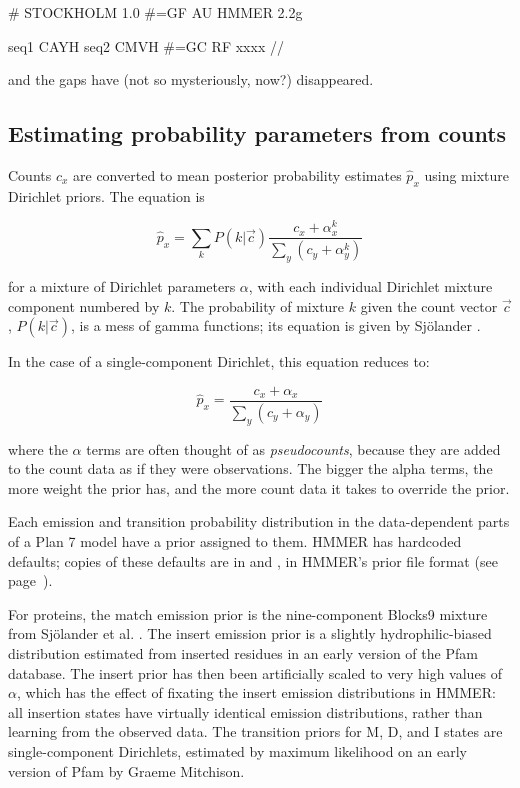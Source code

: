 \begin{sreoutput}
# STOCKHOLM 1.0
#=GF AU    HMMER 2.2g

seq1        CAYH
seq2        CMVH
#=GC RF     xxxx
//
\end{sreoutput}

and the gaps have (not so mysteriously, now?) disappeared.

\subsection{Estimating probability parameters from counts}

Counts $c_x$ are converted to mean posterior probability estimates
$\hat{p}_x$ using mixture Dirichlet priors.  The equation is

\[
  \hat{p}_x = \sum_k P(k | \vec{c})
  \frac{c_x + \alpha_x^k}{\sum_{y} (c_y + \alpha_{y}^k) }
\]

for a mixture of Dirichlet parameters $\alpha$, with each individual
Dirichlet mixture component numbered by $k$. The probability of
mixture $k$ given the count vector $\vec{c}$, $P(k | \vec{c})$, is a
mess of gamma functions; its equation is given by Sj\"{o}lander
\cite{Sjolander96,Durbin98}.

In the case of a single-component Dirichlet, this equation reduces to:

\[ 
  \hat{p}_x = \frac{c_x + \alpha_x}{\sum_{y} (c_y + \alpha_{y}) }
\]

where the $\alpha$ terms are often thought of as \emph{pseudocounts},
because they are added to the count data as if they were observations.
The bigger the alpha terms, the more weight the prior has, and the
more count data it takes to override the prior.

Each emission and transition probability distribution in the
data-dependent parts of a Plan 7 model have a prior assigned to them.
HMMER has hardcoded defaults; copies of these defaults are in
 and , in HMMER's
prior file format (see page~\pageref{section:priorfiles}).

For proteins, the match emission prior is the nine-component Blocks9
mixture from Sj\"{o}lander et al. \cite{Sjolander96}. The insert
emission prior is a slightly hydrophilic-biased distribution estimated
from inserted residues in an early version of the Pfam database. The
insert prior has then been artificially scaled to very high values of
$\alpha$, which has the effect of fixating the insert emission
distributions in HMMER: all insertion states have virtually identical
emission distributions, rather than learning from the observed data.
The transition priors for M, D, and I states are single-component
Dirichlets, estimated by maximum likelihood on an early version of
Pfam by Graeme Mitchison.

